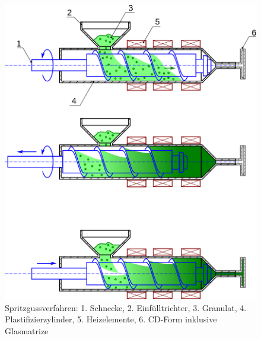 \begin{figure}[h]
    \begin{center}
        \begin{minipage}[t]{\textwidth}
            \begin{center}
                \includegraphics[height=0.5\textheight]{Bilder/Optische_Datentraeger_Die_Compact_Disc/Herstellung/cdspritz.png}
                \caption[Spritzgussverfahren \newline \url{https://upload.wikimedia.org/wikipedia/commons/thumb/2/23/Principe_moulage_injection_polymere.svg/899px-Principe_moulage_injection_polymere.svg.png} (zuletzt aufgerufen am 11.08.2015)]{Spritzgussverfahren: 1. Schnecke, 2. Einfülltrichter, 3. Granulat, 4. Plastifizierzylinder, 5. Heizelemente, 6. CD-Form inklusive Glasmatrize}
                \label{fig:cdspritz}
            \end{center}
        \end{minipage}
    \end{center}
\end{figure}
